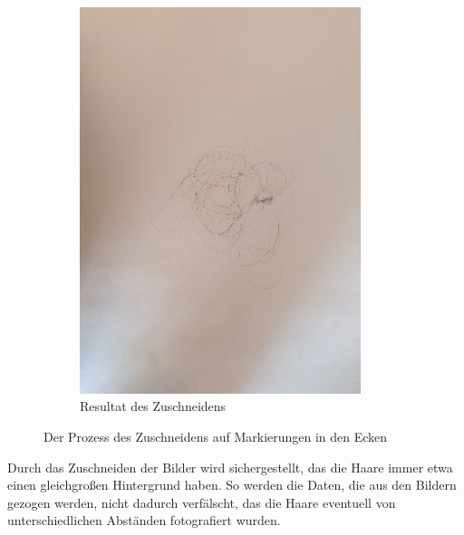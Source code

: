 \documentclass[german,a4paper, 12pt]{llncs}
\begin{document}
\begin{figure}
\begin{subfigure}[b]{0.475\textwidth}
		\includegraphics[width=0.9\textwidth]{fig64/03crop image.png}
		\caption[]{Resultat des Zuschneidens}
		\label{img:Crop}
	\end{subfigure}
	\caption[ der Prozess des Zuschneidens auf Markierungen in den Ecken ]
	{\small Der Prozess des Zuschneidens auf Markierungen in den Ecken} 
	\label{img:cropDots}
\end{figure}


Durch das Zuschneiden der Bilder wird sichergestellt, das die Haare immer etwa einen gleichgroßen Hintergrund haben. So werden die Daten, die aus den Bildern gezogen werden, nicht dadurch verfälscht, das die Haare eventuell von unterschiedlichen Abständen fotografiert wurden. 
\end{document}
